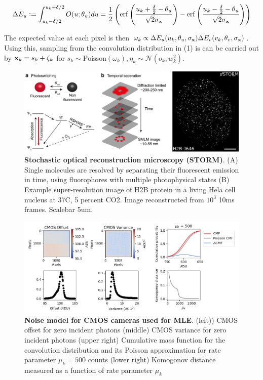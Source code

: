 \begin{equation}
\Delta E_{u} \vcentcolon = \int_{u_{k}-\delta /2}^{u_{k}+\delta /2} O(u;\theta_{u})du = \frac{1}{2}\left(\mathrm{erf}\left(\frac{u_{k}+\frac{\delta}{2}-\theta_{u}}{\sqrt{2}\sigma_{\bold{x}}}\right) -\mathrm{erf}\left(\frac{u_{k}-\frac{\delta}{2}-\theta_{u}}{\sqrt{2}\sigma_{\bold{x}}}\right)\right)
\end{equation}

The expected value at each pixel is then $\omega_{k}\propto \Delta E_{u}(u_{k},\theta_{u},\sigma_{\bold{x}})\Delta E_{v}(v_{k},\theta_{v},\sigma_{\bold{x}}) $. Using this, sampling from the convolution distribution in (1) is can be carried out by $\bold{x}_{k} = s_{k} + \zeta_{k}$ for $s_{k}\sim \mathrm{Poisson}(\omega_{k}), \eta_{k}\sim \mathcal{N}(o_{k},w_{k}^{2})$. 


\begin{figure}
\includegraphics[width=\textwidth]{figures/Intro.png}
\caption{\textbf{Stochastic optical reconstruction microscopy (STORM)}. (A) Single molecules are resolved by separating their fluorescent emission in time, using fluorophores with multiple photophysical states (B) Example super-resolution image of H2B protein in a living Hela cell nucleus at 37C, 5 percent CO2. Image reconstructed from $10^{3}$ 10ms frames. Scalebar 5um.}
\end{figure}

\clearpage
\begin{figure}
\begin{center}
\includegraphics[width=16cm]{figures/Noise.png}
\end{center}
\caption{\textbf{Noise model for CMOS cameras used for MLE}. (left)) CMOS offset for zero incident photons (middle) CMOS variance for zero incident photons (upper right) Cumulative mass function for the convolution distribution and its Poisson approximation for rate parameter $\mu_{k} = 500$ counts (lower right) Komogonov distance measured as a function of rate parameter $\mu_{k}$}
\end{figure}


